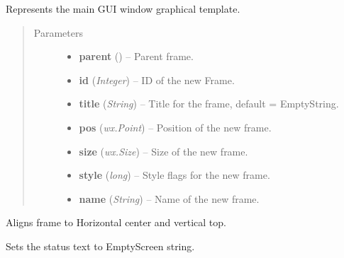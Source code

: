 \documentclass[letterpaper,10pt,english]{sphinxmanual}
\begin{document}

\begin{fulllineitems}
\label{graphicaldesign:graphicaldesign.GUItemplate}
Represents the main GUI window graphical template.
\begin{quote}\begin{description}
\item[{Parameters}] \leavevmode\begin{itemize}
\item {} 
\textbf{parent} () -- Parent frame.

\item {} 
\textbf{id} (\emph{Integer}) -- ID of the new Frame.

\item {} 
\textbf{title} (\emph{String}) -- Title for the frame, default = EmptyString.

\item {} 
\textbf{pos} (\emph{wx.Point}) -- Position of the new frame.

\item {} 
\textbf{size} (\emph{wx.Size}) -- Size of the new frame.

\item {} 
\textbf{style} (\emph{long}) -- Style flags for the new frame.

\item {} 
\textbf{name} (\emph{String}) -- Name of  the new frame.

\end{itemize}

\end{description}\end{quote}

\begin{fulllineitems}
\label{graphicaldesign:graphicaldesign.GUItemplate.AlignCenterTop}
Aligns frame to Horizontal center and vertical top.

\end{fulllineitems}


\begin{fulllineitems}
\label{graphicaldesign:graphicaldesign.GUItemplate.ClearStatusText}
Sets the status text to EmptyScreen string.


\end{fulllineitems}
\end{fulllineitems}
\end{document}
